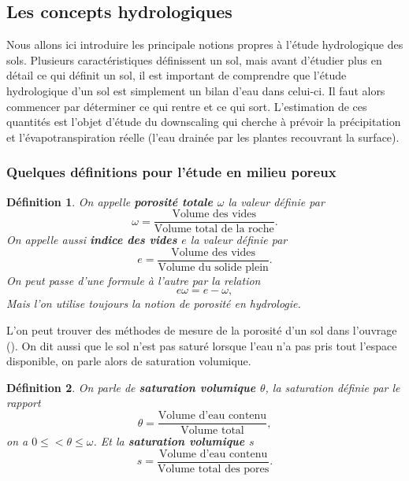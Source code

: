 \documentclass[a4paper,11pt]{article}
\newtheorem{definition}{Définition}
\begin{document}
\subsection{Les concepts hydrologiques}
\label{hydro}

Nous allons ici introduire les principale notions propres à l'étude hydrologique des sols. Plusieurs caractéristiques définissent un sol, mais avant d'étudier  plus en détail ce qui définit un sol, il est important de comprendre que l'étude hydrologique d'un sol est simplement un bilan d'eau dans celui-ci. Il faut alors commencer par déterminer ce qui rentre et ce qui sort. L'estimation de ces quantités est l'objet d'étude du downscaling qui cherche à prévoir la précipitation et l'évapotranspiration réelle (l'eau drainée par les plantes recouvrant la surface).

\subsubsection{Quelques définitions pour l'étude en milieu poreux}

\label{modelisation}
\begin{definition}
	On appelle \textbf{porosité totale $\omega$} la valeur définie par
	\begin{equation}
		\omega =\frac{\textrm{Volume des vides}}{\textrm{Volume total de la roche}}.
	\end{equation}
	On appelle aussi \textbf{indice des vides $e$} la valeur définie par 
	\begin{equation}
		e=\frac{\textrm{Volume des vides}}{\textrm{Volume du solide plein}}.
	\end{equation}
	On peut passe d'une formule à l'autre par la relation 
	\[e\omega=e-\omega,\]
	Mais l'on utilise toujours la notion de porosité en hydrologie. 
\end{definition}
L'on peut trouver des méthodes de mesure de la porosité d'un sol dans l'ouvrage (\cite{marsily_de1986quantitative}). On dit aussi que le sol n'est pas saturé lorsque l'eau n'a pas pris tout l'espace disponible, on parle alors de saturation volumique.
\begin{definition}
	On parle de \textbf{saturation volumique $\theta$}, la saturation définie par le rapport
	\begin{equation}
		\theta= \frac{\textrm{Volume d'eau contenu}}{\textrm{Volume total}},
	\end{equation}
	on a $0\leq<\theta\leq \omega$. Et la \textbf{saturation volumique $s$}
	\begin{equation}
		s=\frac{\textrm{Volume d'eau contenu}}{\textrm{Volume total des pores}}.
	\end{equation}
\end{definition}
\end{document}
